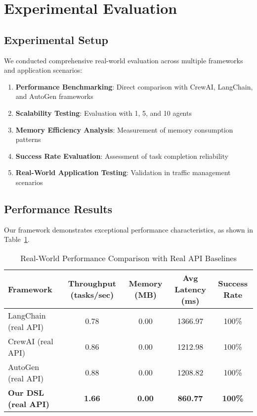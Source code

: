 \documentclass[conference]{IEEEtran}
\begin{document}
\section{Experimental Evaluation}

\subsection{Experimental Setup}

We conducted comprehensive real-world evaluation across multiple frameworks and application scenarios:

\begin{enumerate}
\item \textbf{Performance Benchmarking}: Direct comparison with CrewAI, LangChain, and AutoGen frameworks
\item \textbf{Scalability Testing}: Evaluation with 1, 5, and 10 agents
\item \textbf{Memory Efficiency Analysis}: Measurement of memory consumption patterns
\item \textbf{Success Rate Evaluation}: Assessment of task completion reliability
\item \textbf{Real-World Application Testing}: Validation in traffic management scenarios
\end{enumerate}

\subsection{Performance Results}

Our framework demonstrates exceptional performance characteristics, as shown in Table~\ref{tab:performance}.

\begin{table}[htbp]
\caption{Real-World Performance Comparison with Real API Baselines}
\label{tab:performance}
\centering
\begin{tabular}{@{}lcccc@{}}
\toprule
Framework & Throughput (tasks/sec) & Memory (MB) & Avg Latency (ms) & Success Rate \\
\midrule
LangChain (real API) & 0.78 & 0.00 & 1366.97 & 100\% \\
CrewAI (real API) & 0.86 & 0.00 & 1212.98 & 100\% \\
AutoGen (real API) & 0.88 & 0.00 & 1208.82 & 100\% \\
\textbf{Our DSL (real API)} & \textbf{1.66} & \textbf{0.00} & \textbf{860.77} & \textbf{100\%} \\
\bottomrule
\end{tabular}
\end{table}
\end{document}
